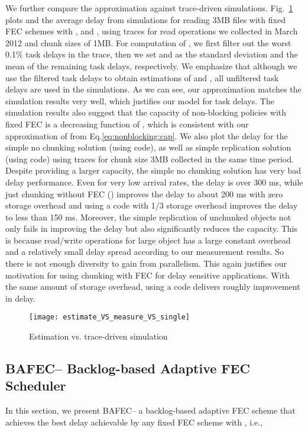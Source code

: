 \documentclass[journal]{IEEEtran}
\newcommand{\nonBlocking}{{BAFEC}\xspace}
\begin{document}
We further compare the approximation against trace-driven simulations.  Fig.~\ref{fig:estimate_VS_trace} plots  and the average delay from  simulations for reading 3MB files with fixed FEC schemes with ,  and , using traces for read operations we collected in March 2012 and chunk sizes of 1MB. For computation of , we first filter out the worst 0.1\% task delays in the trace, then we set  and  as the standard deviation and the mean of the remaining task delays, respectively. 
We emphasize that although we use the filtered task delays to obtain estimations of  and , all unfiltered task delays are used in the simulations. 
As we can see, our approximation matches the simulation results very well, which justifies our  model for task delays. The simulation results also suggest that the capacity of non-blocking policies with fixed FEC is a decreasing function of , which is consistent with our approximation of  from Eq.\ref{eq:nonblocking:cap}. We also plot the delay for the simple no chunking solution (using  code), as well as simple  replication solution (using  code) using traces for  chunk size 3MB collected in the same time period. Despite providing a larger capacity, the simple no chunking solution has very bad delay performance. Even for very low arrival rates, the delay is over 300 ms, while just chunking without FEC () improves the delay to about 200 ms with zero storage overhead and using a  code with 1/3 storage overhead improves the delay to less than 150 ms. Moreover, the simple replication of unchunked objects not only fails in improving the delay but also significantly reduces the capacity.
This is because read/write operations for large object has a large constant overhead  and a relatively small delay spread  according to our measurement results. So there is not enough diversity to gain from parallelism.
This again justifies our motivation for using chunking with FEC for delay sensitive applications. With the same amount of storage overhead, using a  code delivers roughly  improvement in delay.

\begin{figure}[t]
\centering
\texttt{[image: estimate\_VS\_measure\_VS\_single]}
\vspace{-10pt}
\caption{Estimation vs.  trace-driven simulation}
\label{fig:estimate_VS_trace}
\vspace{-10pt}
\end{figure}


\subsection{\nonBlocking -- Backlog-based Adaptive FEC Scheduler }
In this section, we present \nonBlocking -- a backlog-based adaptive FEC scheme that achieves the best delay achievable by any fixed FEC scheme with , i.e.,
\end{document}

